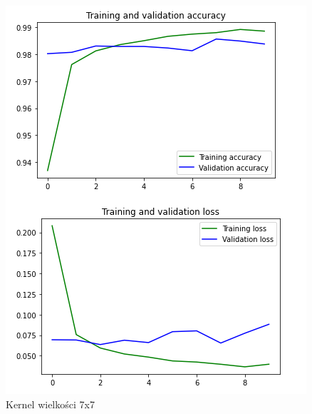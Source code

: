 \documentclass{article}
\begin{document}
\begin{figure}[h]
  \centering
  \includegraphics[width=\linewidth]{kernel_7_7.png}
  \caption{Kernel wielkości 7x7}
\end{figure}
\end{document}
